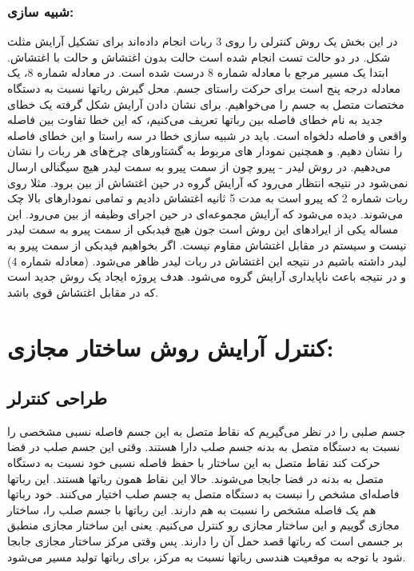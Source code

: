 \subsubsection{شبیه سازی:}
در این بخش یک روش کنترلی را روی 3 ربات انجام داده‌‌اند برای تشکیل آرایش مثلث شکل. در دو حالت تست انجام شده است حالت بدون اغتشاش و حالت با اغتشاش.
ابتدا یک مسیر مرجع با معادله شماره 8 درست شده است.
در معادله شماره 8، 
یک معادله درجه پنج است برای حرکت راستای جسم.
محل گیرش رباتها نسبت به دستگاه مختصات متصل به جسم را می‌خواهیم.
برای نشان دادن آرایش شکل گرفته یک خطای جدید به نام خطای فاصله بین رباتها تعریف می‌کنیم، که این خطا تفاوت بین فاصله واقعی و فاصله دلخواه است.
باید در شبیه سازی خطا در سه راستا و این خطای فاصله را نشان دهیم.
و همچنین نمودار های مربوط به گشتاورهای چرخ‌های هر ربات را نشان می‌دهیم.
در روش لیدر - پیرو چون از سمت پیرو به سمت لیدر هیچ سیگنالی ارسال نمی‌شود در نتیجه انتظار می‌رود که آرایش گروه در حین اغتشاش از بین برود.
مثلا روی ربات شماره 2 که پیرو است به مدت 5 ثانیه اغتشاش دادیم و تمامی نمودارهای بالا چک می‌شوند.
دیده می‌شود که آرایش مجموعه‌ای در حین اجرای وظیفه از بین می‌رود. این مساله یکی از ایرادهای این روش است جون هیچ فیدبکی از سمت پیرو به سمت لیدر نیست و سیستم در مقابل اغتشاش مقاوم نیست.
اگر بخواهیم فیدبکی از سمت پیرو به لیدر داشته باشیم در نتیجه این اغتشاش در ربات لیدر ظاهر می‌شود. (معادله شماره 4) و در نتیجه باعث ناپایداری آرایش گروه می‌شود.
هدف پروژه ایجاد یک روش جدید است که در مقابل اغتشاش قوی باشد.

\section{کنترل آرایش روش ساختار مجازی:}
\subsection{طراحی کنترلر}
جسم صلبی را در نظر می‌گیریم که نقاط متصل به این جسم فاصله نسبی مشخصی را نسبت به دستگاه متصل به بدنه جسم صلب دارا هستند. وقتی این جسم صلب در فضا حرکت کند نقاط متصل به این ساختار با حفظ فاصله نسبی خود نسبت به دستگاه متصل به بدنه در فضا جابجا می‌شوند. حالا این نقاط همون رباتها هستند. این رباتها فاصله‌ای مشخص را نبست به دستگاه متصل به جسم صلب اختیار می‌کنند. خود رباتها هم یک فاصله مشخص را نسبت به هم دارند. این رباتها با جسم صلب را، ساختار مجازی گوییم و این ساختار مجازی رو کنترل می‌کنیم.
یعنی این ساختار مجازی منطبق بر جسمی است که رباتها قصد حمل آن را دارند. پس وقتی مرکز ساختار مجازی جابجا شود با توجه به موقعیت هندسی رباتها نسبت به مرکز، برای رباتها تولید مسیر می‌شود.

